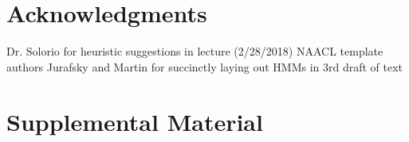 \documentclass[11pt,a4paper]{article}
\begin{document}
\section*{Acknowledgments}

Dr. Solorio for heuristic suggestions in lecture (2/28/2018)
NAACL template authors
Jurafsky and Martin for succinctly laying out HMMs in 3rd draft of text




\appendix

\section{Supplemental Material}
\label{sec:supplemental}
\end{document}
